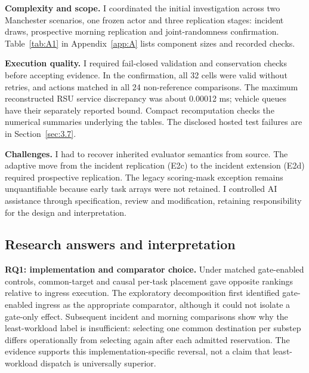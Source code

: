 \documentclass[12pt,a4paper]{article}
\begin{document}
\textbf{Complexity and scope.} I coordinated the initial investigation across two Manchester scenarios, one frozen actor and three replication stages: incident draws, prospective morning replication and joint-randomness confirmation. Table~\ref{tab:A1} in Appendix~\ref{app:A} lists component sizes and recorded checks.

\textbf{Execution quality.} I required fail-closed validation and conservation checks before accepting evidence. In the confirmation, all 32 cells were valid without retries, and actions matched in all 24 non-reference comparisons. The maximum reconstructed RSU service discrepancy was about 0.00012 ms; vehicle queues have their separately reported bound. Compact recomputation checks the numerical summaries underlying the tables. The disclosed hosted test failures are in Section~\ref{sec:3.7}.

\textbf{Challenges.} I had to recover inherited evaluator semantics from source. The adaptive move from the incident replication (E2c) to the incident extension (E2d) required prospective replication. The legacy scoring-mask exception remains unquantifiable because early task arrays were not retained. I controlled AI assistance through specification, review and modification, retaining responsibility for the design and interpretation.

\FloatBarrier
\subsection{Research answers and interpretation}\label{sec:4.3}

\textbf{RQ1: implementation and comparator choice.} Under matched gate-enabled controls, common-target and causal per-task placement gave opposite rankings relative to ingress execution. The exploratory decomposition first identified gate-enabled ingress as the appropriate comparator, although it could not isolate a gate-only effect. Subsequent incident and morning comparisons show why the least-workload label is insufficient: selecting one common destination per substep differs operationally from selecting again after each admitted reservation. The evidence supports this implementation-specific reversal, not a claim that least-workload dispatch is universally superior.
\end{document}
